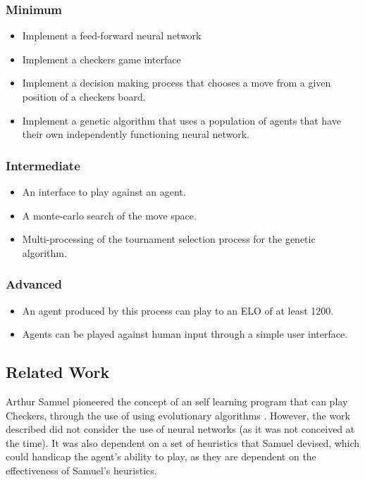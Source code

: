 \documentclass[12pt,a4paper]{article}
\begin{document}
    \subsubsection*{Minimum}

    \begin{itemize}
    \item Implement a feed-forward neural network
    \item Implement a checkers game interface
    \item Implement a decision making process that chooses a move from a given position of a checkers board.
    \item Implement a genetic algorithm that uses a population of agents that have their own independently functioning neural network.
    \end{itemize}

    \subsubsection*{Intermediate}

    \begin{itemize}
    \item An interface to play against an agent.
    \item A monte-carlo search of the move space.
    \item Multi-processing of the tournament selection process for the genetic algorithm.
    \end{itemize}

    \subsubsection*{Advanced}

    \begin{itemize}
    \item An agent produced by this process can play to an ELO of at least 1200.
    \item Agents can be played against human input through a simple user interface.
    \end{itemize}

\subsection*{Related Work}

    Arthur Samuel pioneered the concept of an self learning program that can play Checkers, through the use of using evolutionary algorithms \cite{samuel_studies_2000}. However, the work described did not consider the use of neural networks (as it was not conceived at the time). It was also  dependent on a set of heuristics that Samuel devised, which could handicap  the agent's ability to play, as they are dependent on the effectiveness of Samuel's heuristics. 
\end{document}
